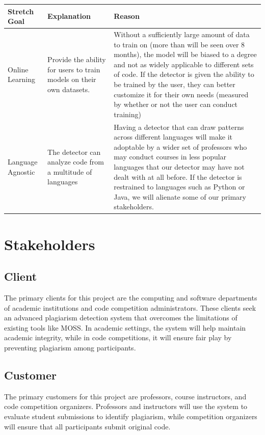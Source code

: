 \documentclass[12pt]{article}
\begin{document}
\begin{center}
    \begin{tabular}{ | p{3cm} | p{6cm} | p{6cm} | }
    \hline
    \textbf{Stretch Goal} & \textbf{Explanation} & \textbf{Reason} \\
    \hline
    Online Learning & Provide the ability for users to train models on their own datasets. & 
    Without a sufficiently large amount of data to train on (more than will be seen over 8 months), the model will be biased to a degree and not as widely applicable to different sets of code. If the detector is given the ability to be trained by the user, they can better customize it for their own needs (measured by whether or not the user can conduct training)\\
    \hline
    Language Agnostic & The detector can analyze code from a multitude of languages & 
    Having a detector that can draw patterns across different languages will make it adoptable by a wider set of professors who may conduct courses in less popular languages that our detector may have not dealt with at all before. If the detector is restrained to languages such as Python or Java, we will alienate some of our primary stakeholders.\\
    \hline
    \end{tabular}
\end{center}

\section{Stakeholders}

\subsection{Client}
The primary clients for this project are the computing and software departments
of academic institutions and code competition administrators. These clients
seek an advanced plagiarism detection system that overcomes the limitations of
existing tools like MOSS. In academic settings, the system will help maintain
academic integrity, while in code competitions, it will ensure fair play by
preventing plagiarism among participants.

\subsection{Customer}
The primary customers for this project are professors, course instructors, and
code competition organizers. Professors and instructors will use the system to
evaluate student submissions to identify plagiarism, while competition
organizers will ensure that all participants submit original code. 
\end{document}
